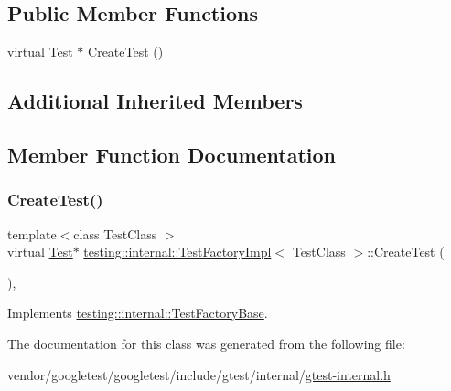 \subsection*{Public Member Functions}
\begin{DoxyCompactItemize}
\item 
virtual \hyperlink{classtesting_1_1_test}{Test} $\ast$ \hyperlink{classtesting_1_1internal_1_1_test_factory_impl_a8860c89bdb06450a5d5e8137ebd9d775}{Create\+Test} ()
\end{DoxyCompactItemize}
\subsection*{Additional Inherited Members}


\subsection{Member Function Documentation}
\mbox{\label{classtesting_1_1internal_1_1_test_factory_impl_a8860c89bdb06450a5d5e8137ebd9d775}} 
\subsubsection{\texorpdfstring{Create\+Test()}{CreateTest()}}
{\footnotesize\ttfamily template$<$class Test\+Class $>$ \\
virtual \hyperlink{classtesting_1_1_test}{Test}$\ast$ \hyperlink{classtesting_1_1internal_1_1_test_factory_impl}{testing\+::internal\+::\+Test\+Factory\+Impl}$<$ Test\+Class $>$\+::Create\+Test (\begin{DoxyParamCaption}{ }\end{DoxyParamCaption})\hspace{0.3cm}{\ttfamily [inline]}, {\ttfamily [virtual]}}



Implements \hyperlink{classtesting_1_1internal_1_1_test_factory_base_a07ac3ca0b196cdb092da0bb186b7c030}{testing\+::internal\+::\+Test\+Factory\+Base}.



The documentation for this class was generated from the following file\+:\begin{DoxyCompactItemize}
\item 
vendor/googletest/googletest/include/gtest/internal/\hyperlink{gtest-internal_8h}{gtest-\/internal.\+h}\end{DoxyCompactItemize}
